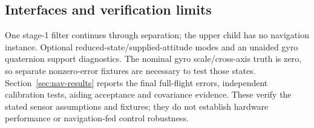 \subsection{Interfaces and verification limits}
One stage-1 filter continues through separation; the upper child has no navigation instance. Optional reduced-state/supplied-attitude modes and an unaided gyro quaternion support diagnostics. The nominal gyro scale/cross-axis truth is zero, so separate nonzero-error fixtures are necessary to test those states. Section~\ref{sec:nav-results} reports the final full-flight errors, independent calibration tests, aiding acceptance and covariance evidence. These verify the stated sensor assumptions and fixtures; they do not establish hardware performance or navigation-fed control robustness.
